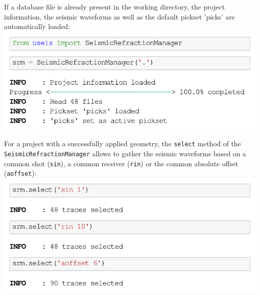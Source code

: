\documentclass[a4paper,fleqn]{cas-sc}
\begin{document}
If a database file is already present in the working directory, the project information, the seismic waveforms as well as the default pickset 'picks' are automatically loaded:
\newline
\includegraphics[width=.5\textwidth]{./figures/load_project.pdf}

For a project with a successfully applied geometry, the \texttt{select} method of the \texttt{SeismicRefractionManager} allows to gather the seismic waveforms based on a common shot (\texttt{sin}), a common receiver (\texttt{rin}) or the common absolute offset (\texttt{aoffset}):
\newline
\includegraphics[width=.5\textwidth]{./figures/select.pdf}
\end{document}
